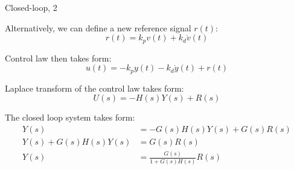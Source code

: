 \documentclass{beamer}
\begin{document}
\begin{frame}{Closed-loop, 2}
	\begin{flushleft}
		
		Alternatively, we can define a new reference signal $r(t)$:
		\begin{equation}
			r(t) = k_p v(t) + k_d \dot v(t)
		\end{equation}
		
		Control law then takes form:
		\begin{equation}
			u(t) = -k_p y(t) - k_d \dot y(t) + r(t)
		\end{equation}
		
		Laplace transform of the control law takes form:
		\begin{equation}
			U(s) = -H(s)Y(s) + R(s)
		\end{equation}
		
		The closed loop system takes form:
		\begin{align}
			Y(s)  &= -G(s) H(s)Y(s) + G(s)R(s) \\
			Y(s) + G(s) H(s)Y(s)  &=  G(s)R(s)\\
			Y(s)  &= \frac{G(s)}{1 + G(s) H(s)} R(s) 
		\end{align}
		
		
	\end{flushleft}
\end{frame}

%		
%		
%		
%		
%		
%		
%		
%		
\end{document}
